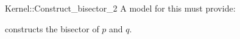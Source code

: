 \begin{ccRefFunctionObjectConcept}{Kernel::Construct_bisector_2}
A model for this must provide:


{constructs the bisector of $p$ and $q$.}

\end{ccRefFunctionObjectConcept}
